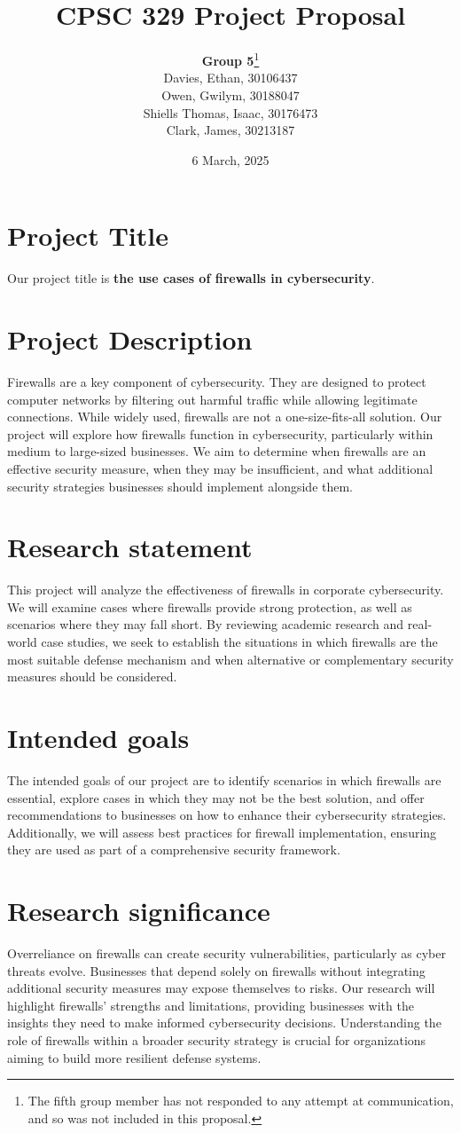 \documentclass{article}
\title{CPSC 329 Project Proposal}
\author{\textbf{Group 5}\footnote{The fifth group member has not responded to any attempt at communication, and so was not included in this proposal.} \\ Davies, Ethan, 30106437 \\ Owen, Gwilym, 30188047\\ Shiells Thomas, Isaac, 30176473 \\ Clark, James, 30213187}
\date{6 March, 2025}
\begin{document}
\maketitle
\section*{Project Title}
Our project title is \textbf{the use cases of firewalls in cybersecurity}.

\section{Project Description}
Firewalls are a key component of cybersecurity. They are designed to protect computer networks by filtering out harmful traffic while allowing legitimate connections. While widely used, firewalls are not a one-size-fits-all solution. Our project will explore how firewalls function in cybersecurity, particularly within medium to large-sized businesses. We aim to determine when firewalls are an effective security measure, when they may be insufficient, and what additional security strategies businesses should implement alongside them.	

\section{Research statement}
This project will analyze the effectiveness of firewalls in corporate cybersecurity. We will examine cases where firewalls provide strong protection, as well as scenarios where they may fall short. By reviewing academic research and real-world case studies, we seek to establish the situations in which firewalls are the most suitable defense mechanism and when alternative or complementary security measures should be considered.

\section{Intended goals}
The intended goals of our project are to identify scenarios in which firewalls are essential, explore cases in which they may not be the best solution, and offer recommendations to businesses on how to enhance their cybersecurity strategies. Additionally, we will assess best practices for firewall implementation, ensuring they are used as part of a comprehensive security framework.

\section{Research significance}
Overreliance on firewalls can create security vulnerabilities, particularly as cyber threats evolve. Businesses that depend solely on firewalls without integrating additional security measures may expose themselves to risks. Our research will highlight firewalls' strengths and limitations, providing businesses with the insights they need to make informed cybersecurity decisions. Understanding the role of firewalls within a broader security strategy is crucial for organizations aiming to build more resilient defense systems.
\end{document}
